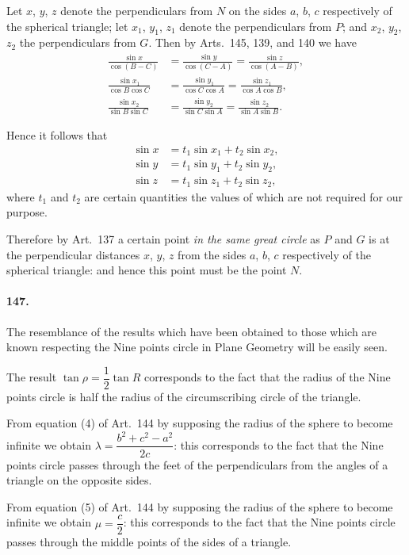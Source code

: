 \documentclass{book}[2004/02/16]
\begin{document}
\begin{mainmatter}
\begin{spacing}{1.3}
Let $x$, $y$, $z$ denote the perpendiculars from $N$ on the sides
$a$, $b$, $c$ respectively of the spherical triangle; let $x_1$, $y_1$, $z_1$ denote
the perpendiculars from $P$; and $x_2$, $y_2$, $z_2$ the perpendiculars from
$G$. Then by Arts.\ 145,
139, and 140 we have
\begin{align*}
\frac{\sin x}{\cos(B - C)} &= \frac{\sin y}{\cos(C - A)} = \frac{\sin z}{\cos(A - B)},\\[1.5ex]
\frac{\sin x_1}{\cos B \cos C} &= \frac{\sin y_1}{\cos C \cos A} = \frac{\sin z_1}{\cos A \cos B},\\[1.5ex]
\frac{\sin x_2}{\sin B \sin C} &= \frac{\sin y_2}{\sin C \sin A} = \frac{\sin z_2}{\sin A \sin B}.
\end{align*}

Hence it follows that
\begin{align*}
\sin x &= t_1 \sin x_1 + t_2 \sin x_2,\\
\sin y &= t_1 \sin y_1 + t_2 \sin y_2,\\
\sin z &= t_1 \sin z_1 + t_2 \sin z_2,
\end{align*}
where $t_1$ and $t_2$ are certain quantities the values of which are not
required for our purpose.

Therefore by Art.\ 137 a certain point \textit{in the same great circle}
as $P$ and $G$ is at the perpendicular distances $x$, $y$, $z$ from the sides
$a$, $b$, $c$ respectively of the spherical triangle: and hence this point
must be the point $N$.

\paragraph{147.} The resemblance of the results which have been obtained
to those which are known respecting the Nine points circle in
Plane Geometry will be easily seen.

The result $\tan\rho = \dfrac12 \tan R$ corresponds to the fact that the
radius of the Nine points circle is half the radius of the circumscribing
circle of the triangle.

From equation (4) of Art.\ 144 by supposing the radius of the
sphere to become infinite we obtain $\lambda = \dfrac{b^2 + c^2 - a^2}{2c}$: this corresponds
to the fact that the Nine points circle passes through the feet of
the perpendiculars from the angles of a triangle on the opposite
sides.

From equation (5) of Art.\ 144 by supposing the radius of the
sphere to become infinite we obtain $\mu = \dfrac{c}{2}$: this corresponds to the
fact that the Nine points circle passes through the middle points
of the sides of a triangle.


\end{spacing}
\end{mainmatter}
\end{document}
